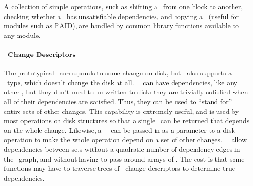 
A collection of simple operations, such as shifting a \chdesc\ from one block to another,
 checking whether a \chdesc\ has unsatisfiable dependencies, and copying a
 \chdesc\ (useful for modules such as RAID),
are handled by common library functions available to any module.




\paragraph{\Noop\ Change Descriptors}
\label{sec:design:chdescs:noop}

The prototypical \chdesc\ corresponds to some change on disk, but \Kudos\
 also supports a \emph{\noop} \chdesc\ type, which doesn't change the disk
 at all.
%
%
\Noop\ \chdescs\ can have dependencies, like any other
\chdesc, but they don't need to be written to disk:  they are trivially satisfied when all of their dependencies are
satisfied.
%
Thus, they can be used to ``stand for'' entire sets of other changes.
%
This capability is extremely useful, and is used by most operations on disk
structures so that a single \chdesc\ can be returned that depends on the whole
change. Likewise, a \noop\ \chdesc\ can be passed in as a parameter to a disk
operation to make the whole operation depend on a set of other changes. \Noop\
\chdescs\ allow dependencies between sets without a quadratic number
of dependency edges in the \chdesc\ graph, and without having to pass around
arrays of \chdescs.
%
The cost is that some functions may have to traverse trees of \noop\ change
 descriptors to determine true dependencies.

